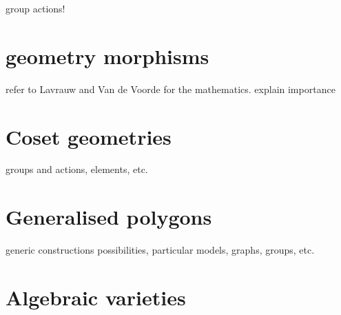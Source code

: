 \documentclass{article}
\begin{document}
group actions!

\section{geometry morphisms}

refer to Lavrauw and Van de Voorde for the mathematics. explain importance

\section{Coset geometries}

groups and actions, elements, etc.

\section{Generalised polygons}

generic constructions possibilities, particular models, graphs, groups, etc.

\section{Algebraic varieties}


\end{document}

